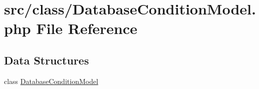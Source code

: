 \hypertarget{_database_condition_model_8php}{}\section{src/class/\+Database\+Condition\+Model.php File Reference}
\label{_database_condition_model_8php}
\subsection*{Data Structures}
\begin{DoxyCompactItemize}
\item 
class \hyperlink{class_database_condition_model}{Database\+Condition\+Model}
\end{DoxyCompactItemize}
